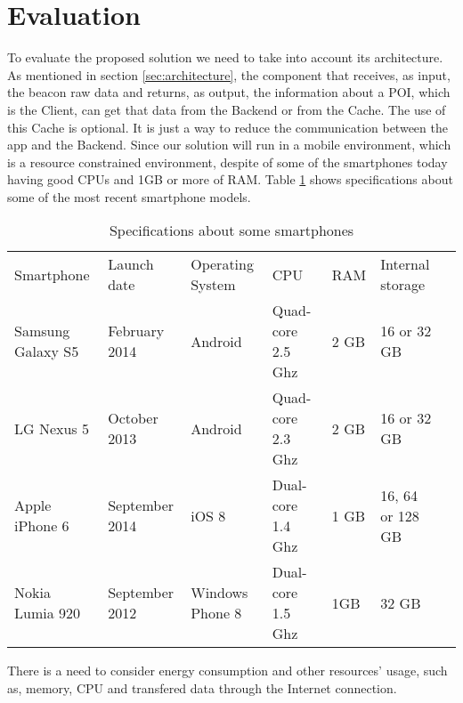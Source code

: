 
% 
% 

\section{Evaluation}
\label{sec:evaluation}


To evaluate the proposed solution we need to take into account its
architecture. As mentioned in section \ref{sec:architecture},
the component that receives, as input, the beacon raw data and
returns, as output, the information about a POI, which is the
Client, can get that data from the Backend or from the Cache.
The use of this Cache is optional. It is just a way to reduce
the communication between the app and the Backend.
Since our solution will run in a mobile environment, 
which is a resource constrained environment,
despite of some of the smartphones today having
good CPUs and 1GB or more of RAM.
Table \ref{tab:smartphones} shows specifications about some 
of the most recent smartphone models.
\begin{table}[h]
\centering
\begin{tabular}{|l|l|l|l|l|l|l}
\cline{1-6}
Smartphone & Launch date & Operating System & CPU & RAM & Internal storage
\\
\cline{1-6}
Samsung Galaxy S5 & February 2014 & Android & Quad-core 2.5 Ghz & 2 GB & 16 or 32 GB
\\
\cline{1-6}
LG Nexus 5 & October 2013 & Android & Quad-core 2.3 Ghz & 2 GB & 16 or 32 GB
\\
\cline{1-6}
Apple iPhone 6 & September 2014 & iOS 8 & Dual-core 1.4 Ghz & 1 GB & 16, 64 or 128 GB
\\
\cline{1-6}
Nokia Lumia 920 & September 2012 & Windows Phone 8 & Dual-core 1.5 Ghz & 1GB & 32 GB
\\
\hline
\end{tabular}
\caption{Specifications about some smartphones}
\label{tab:smartphones}
\end{table}
There is a need to consider energy consumption and other resources'
usage, such as, memory, CPU and transfered data through the
Internet connection.

